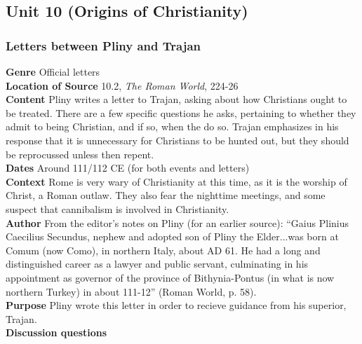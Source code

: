 \documentclass{article}
\begin{document}
\subsection*{Unit 10 (Origins of Christianity)}
\subsubsection*{Letters between Pliny and Trajan}
\textbf{Genre}
Official letters \\
\textbf{Location of Source}
10.2, \textit{The Roman World}, 224-26 \\
\textbf{Content}
Pliny writes a letter to Trajan, asking about how Christians ought to be treated. There are a
few specific questions he asks, pertaining to whether they admit to being Christian, and if so,
when the do so. Trajan emphasizes in his response that it is unnecessary for Christians to be
hunted out, but they should be reprocussed unless then repent.\\
\textbf{Dates}
Around 111/112 CE (for both events and letters) \\
\textbf{Context}
Rome is very wary of Christianity at this time, as it is the worship of Christ, a Roman outlaw.
They also fear the nighttime meetings, and some suspect that cannibalism is involved in
Christianity. \\
\textbf{Author}
From the editor’s notes on Pliny (for an earlier source): “Gaius Plinius Caecilius Secundus,
nephew and adopted son of Pliny the Elder...was born at Comum (now Como), in northern
Italy, about AD 61.  He had a long and distinguished career as a lawyer and public servant,
culminating in his appointment as governor of the province of Bithynia-Pontus (in what is
now northern Turkey) in about 111-12” (Roman World, p. 58). \\
\textbf{Purpose}
Pliny wrote this letter in order to recieve guidance from his superior, Trajan. \\
\textbf{Discussion questions}
\end{document}
